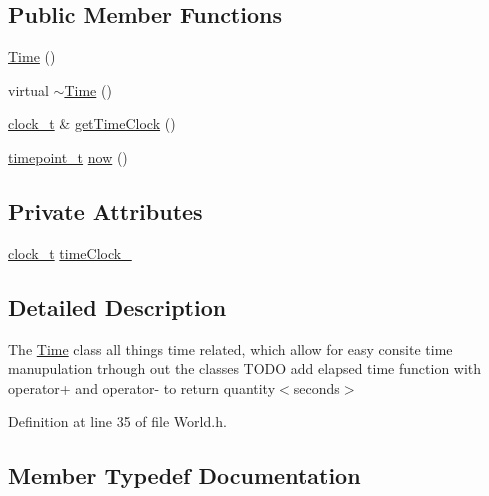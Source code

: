 \subsection*{Public Member Functions}
\begin{DoxyCompactItemize}
\item 
\hyperlink{classo_cpt_1_1_world_1_1_time_a831b0a1d8bd9ebe4ebe0111bd4516eb5}{Time} ()
\item 
virtual \hyperlink{classo_cpt_1_1_world_1_1_time_a18956e4ec6a4fb4cc3a2067c9163d75d}{$\sim$\+Time} ()
\item 
\hyperlink{classo_cpt_1_1_world_1_1_time_ac41de01610f32d0ace4844ed3bf454f7}{clock\+\_\+t} \& \hyperlink{classo_cpt_1_1_world_1_1_time_a6fddffab679f3577de92c5ddf6f15f47}{get\+Time\+Clock} ()
\item 
\hyperlink{classo_cpt_1_1_world_1_1_time_a6a6e782c3c90622c1c7070b0a223ec4c}{timepoint\+\_\+t} \hyperlink{classo_cpt_1_1_world_1_1_time_a5f2069131e8ef21cb6e555fd633986fb}{now} ()
\end{DoxyCompactItemize}
\subsection*{Private Attributes}
\begin{DoxyCompactItemize}
\item 
\hyperlink{classo_cpt_1_1_world_1_1_time_ac41de01610f32d0ace4844ed3bf454f7}{clock\+\_\+t} \hyperlink{classo_cpt_1_1_world_1_1_time_a219308dd501f332e4d49f30ad4e5206e}{time\+Clock\+\_\+}
\end{DoxyCompactItemize}


\subsection{Detailed Description}
The \hyperlink{classo_cpt_1_1_world_1_1_time}{Time} class all things time related, which allow for easy consite time manupulation trhough out the classes T\+O\+DO add elapsed time function with operator+ and operator-\/ to return quantity$<$seconds$>$ 

Definition at line 35 of file World.\+h.



\subsection{Member Typedef Documentation}
\hypertarget{classo_cpt_1_1_world_1_1_time_ac41de01610f32d0ace4844ed3bf454f7}{}\label{classo_cpt_1_1_world_1_1_time_ac41de01610f32d0ace4844ed3bf454f7} 
